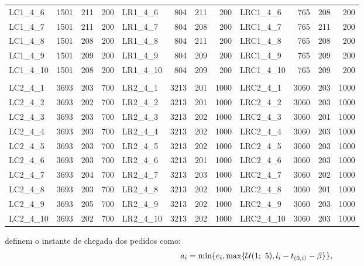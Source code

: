 \begin{center}
\begin{longtable}{lrrr|lrrr|lrrr}
        LC1\_4\_6  & 1501 & 211 & 200 & LR1\_4\_6  &  804 & 211 &  200 & LRC1\_4\_6  &  765 & 208 &  200\\
        LC1\_4\_7  & 1501 & 211 & 200 & LR1\_4\_7  &  804 & 208 &  200 & LRC1\_4\_7  &  765 & 211 &  200\\
        LC1\_4\_8  & 1501 & 208 & 200 & LR1\_4\_8  &  804 & 211 &  200 & LRC1\_4\_8  &  765 & 208 &  200\\
        LC1\_4\_9  & 1501 & 209 & 200 & LR1\_4\_9  &  804 & 209 &  200 & LRC1\_4\_9  &  765 & 209 &  200\\
        LC1\_4\_10 & 1501 & 208 & 200 & LR1\_4\_10 &  804 & 209 &  200 & LRC1\_4\_10 &  765 & 209 &  200\\
                   &      &     &     &            &      &     &      &             &      &     &     \\
        LC2\_4\_1  & 3693 & 203 & 700 & LR2\_4\_1  & 3213 & 201 & 1000 & LRC2\_4\_1  & 3060 & 203 & 1000\\
        LC2\_4\_2  & 3693 & 202 & 700 & LR2\_4\_2  & 3213 & 201 & 1000 & LRC2\_4\_2  & 3060 & 203 & 1000\\
        LC2\_4\_3  & 3693 & 203 & 700 & LR2\_4\_3  & 3213 & 202 & 1000 & LRC2\_4\_3  & 3060 & 201 & 1000\\
        LC2\_4\_4  & 3693 & 203 & 700 & LR2\_4\_4  & 3213 & 202 & 1000 & LRC2\_4\_4  & 3060 & 203 & 1000\\
        LC2\_4\_5  & 3693 & 203 & 700 & LR2\_4\_5  & 3213 & 202 & 1000 & LRC2\_4\_5  & 3060 & 203 & 1000\\
        LC2\_4\_6  & 3693 & 203 & 700 & LR2\_4\_6  & 3213 & 201 & 1000 & LRC2\_4\_6  & 3060 & 203 & 1000\\
        LC2\_4\_7  & 3693 & 204 & 700 & LR2\_4\_7  & 3213 & 203 & 1000 & LRC2\_4\_7  & 3060 & 202 & 1000\\
        LC2\_4\_8  & 3693 & 203 & 700 & LR2\_4\_8  & 3213 & 202 & 1000 & LRC2\_4\_8  & 3060 & 201 & 1000\\
        LC2\_4\_9  & 3693 & 205 & 700 & LR2\_4\_9  & 3213 & 202 & 1000 & LRC2\_4\_9  & 3060 & 203 & 1000\\
        LC2\_4\_10 & 3693 & 202 & 700 & LR2\_4\_10 & 3213 & 202 & 1000 & LRC2\_4\_10 & 3060 & 203 & 1000\\
    \hline
\end{longtable}
\end{center}

\textcite{pureza_laporte_waiting_2008} definem o instante de chegada dos
pedidos como:
%
\begin{equation}
    a_{i} = \min\{e_i,
    \max\{\mathcal{U}(1;\ 5), l_i -
    t_{(0,i)} - \beta\}\},
  \label{eq:pureza_waiting_2008_requestArrivalTime}
\end{equation}

